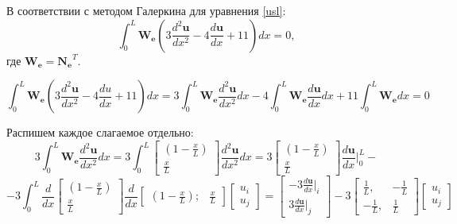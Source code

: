 В соответствии с методом Галеркина для уравнения \ref{usl}:
\begin{equation}\label{lin}
\int_0^L \mathbf{W_e}\left( 3\frac{d^2\mathbf{u}}{dx^2} -4  \frac{d\mathbf{u}}{dx}  +11 \right) d x=0,
\end{equation}
где $\mathbf{W_e=N_e}^T$.

$$\int_0^L \mathbf{W_e}\left(3\frac{d^2\mathbf{u}}{dx^2} -4  \frac{du}{dx}  +11 \right) d x= 3\int_0^L \mathbf{W_e} \frac{d^2 \mathbf{u}}{dx^2} dx  -4   \int_0^L \mathbf{W_e}\frac{d\mathbf{u}}{dx} d x   +11 \int_0^L \mathbf{W_e} d x=0$$

Распишем каждое слагаемое отдельно:
$$
3\int_0^L \mathbf{W_e} \frac{d^2 \mathbf{u}}{dx^2} dx=3\int_0^L
	\begin{bmatrix}
	(1-\frac{x}{L}) \\
	\frac{x}{L}
	\end{bmatrix}
\frac{d^2 \mathbf{u}}{dx^2} dx =
3
	\begin{bmatrix}
	(1-\frac{x}{L}) \\
	\frac{x}{L}
	\end{bmatrix}
\frac{d\mathbf{u}}{dx} |_0^L -
$$
$$
  -3  \int_0^L
\frac{d}{dx}
	\begin{bmatrix}
	(1-\frac{x}{L}) \\
	\frac{x}{L}
	\end{bmatrix}
\frac{d}{dx}
	\begin{bmatrix}
	(1-\frac{x}{L}); & \frac{x}{L}
	\end{bmatrix}
	\begin{bmatrix}
	u_i \\
	u_j
	\end{bmatrix}
=
	\begin{bmatrix}
	  -3 \frac{d\mathbf{u}}{dx}|_i \\
3\frac{d\mathbf{u}}{dx}|_j
	\end{bmatrix}   -3 
\begin{bmatrix}
\frac{1}{L}, & -\frac{1}{L} \\
-\frac{1}{L}, & \frac{1}{L}
\end{bmatrix}
\begin{bmatrix}
u_i \\
u_j
\end{bmatrix}
$$

